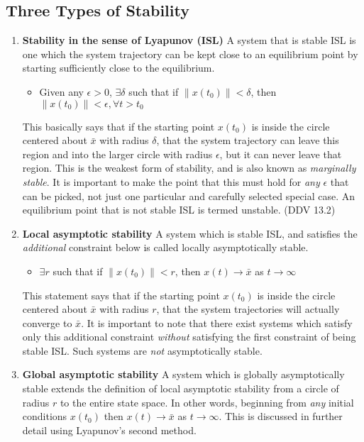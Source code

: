 \subsection{Three Types of Stability}

\begin{enumerate}
  \item{\textbf{Stability in the sense of Lyapunov (ISL)} A system that is stable ISL is one which the system trajectory can be kept close to an equilibrium point by starting sufficiently close to the equilibrium.
  \begin{itemize}
    \item{Given any $\epsilon>0$, $\exists\delta$ such that if $\|x(t_{0})\|<\delta$, then $\|x(t_{0})\|<\epsilon, \forall t>t_{0}$}
  \end{itemize}
  This basically says that if the starting point $x(t_{0})$ is inside the circle centered about $\bar{x}$ with radius $\delta$, that the system trajectory can leave this region and into the larger circle with radius $\epsilon$, but it can never leave that region.
  This is the weakest form of stability, and is also known as \textit{marginally stable}.
  It is important to make the point that this must hold for \textit{any} $\epsilon$ that can be picked, not just one particular and carefully selected special case.
  An equilibrium point that is not stable ISL is termed unstable.
  (DDV 13.2)}

  \item{\textbf{Local asymptotic stability} A system which is stable ISL, and satisfies the \textit{additional} constraint below is called locally asymptotically stable.
  \begin{itemize}
    \item{$\exists r$ such that if $\|x(t_{0})\|<r$, then $x(t)\rightarrow\bar{x}$ as $t\rightarrow\infty$}
  \end{itemize}
  This statement says that if the starting point $x(t_{0})$ is inside the circle centered about $\bar{x}$ with radius $r$, that the system trajectories will actually converge to $\bar{x}$.
  It is important to note that there exist systems which satisfy only this additional constraint \textit{without} satisfying the first constraint of being stable ISL.\@
  Such systems are \textit{not} asymptotically stable.}

  \item{\textbf{Global asymptotic stability} A system which is globally asymptotically stable extends the definition of local asymptotic stability from a circle of radius $r$ to the entire state space.
  In other words, beginning from \textit{any} initial conditions $x(t_{0})$ then $x(t)\rightarrow\bar{x}$ as $t\rightarrow\infty$.
  This is discussed in further detail using Lyapunov's second method.}
\end{enumerate}

